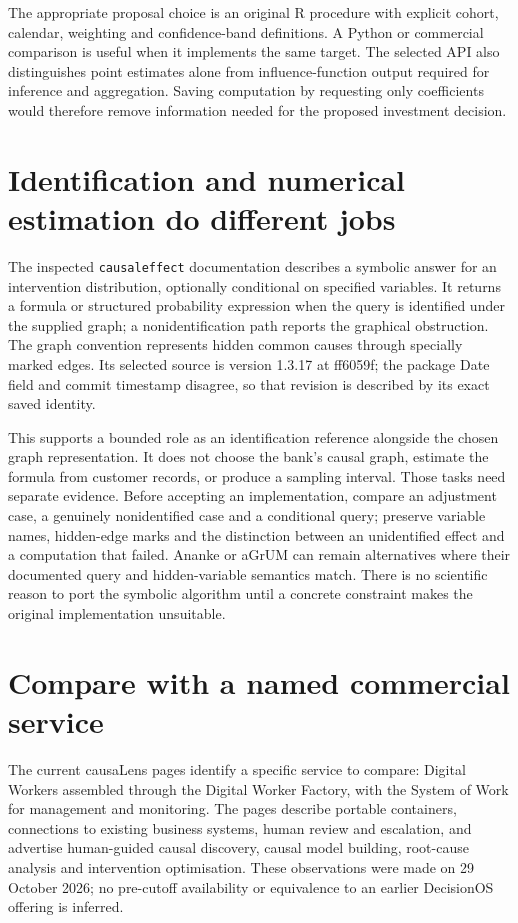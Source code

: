 The appropriate proposal choice is an original R procedure with explicit
cohort, calendar, weighting and confidence-band definitions. A Python or
commercial comparison is useful when it implements the same target. The
selected API also distinguishes point estimates alone from influence-function
output required for inference and aggregation. Saving computation by requesting
only coefficients would therefore remove information needed for the proposed
investment decision. \citep{survey29didapi}

\section{Identification and numerical estimation do different jobs}
The inspected \texttt{causaleffect} documentation describes a symbolic answer
for an intervention distribution, optionally conditional on specified variables.
It returns a formula or structured probability expression when the query is
identified under the supplied graph; a nonidentification path reports the
graphical obstruction. The graph convention represents hidden common causes
through specially marked edges. Its selected source is version 1.3.17 at
ff6059f; the package Date field and commit timestamp disagree, so that
revision is described by its exact saved identity. \citep{exec18_rid_causaleffect}

This supports a bounded role as an identification reference alongside the
chosen graph representation. It does not choose the bank's causal graph,
estimate the formula from customer records, or produce a sampling interval.
Those tasks need separate evidence. Before accepting an implementation, compare
an adjustment case, a genuinely nonidentified case and a conditional query;
preserve variable names, hidden-edge marks and the distinction between an
unidentified effect and a computation that failed. Ananke or aGrUM can remain
alternatives where their documented query and hidden-variable semantics match.
There is no scientific reason to port the symbolic algorithm until a concrete
constraint makes the original implementation unsuitable.

\section{Compare with a named commercial service}
The current causaLens pages identify a specific service to compare: Digital
Workers assembled through the Digital Worker Factory, with the System of Work
for management and monitoring. The pages describe portable containers,
connections to existing business systems, human review and escalation, and
advertise human-guided causal discovery, causal model building, root-cause
analysis and intervention optimisation. These observations were made on
29 October 2026; no pre-cutoff availability or equivalence to an earlier
DecisionOS offering is inferred. \citep{survey29causalens}

